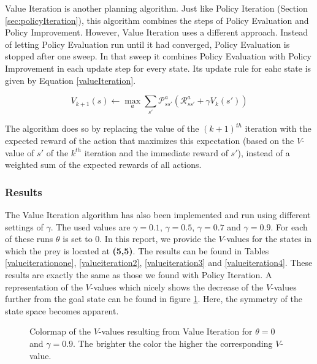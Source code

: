 \documentclass{article}
\begin{document}
Value Iteration is another planning algorithm. Just like Policy Iteration (Section \ref{sec:policyIteration}), this algorithm combines the steps of Policy Evaluation and Policy Improvement. However, Value Iteration uses a different approach. Instead of letting Policy Evaluation run until it had converged, Policy Evaluation is stopped after one sweep. In that sweep it combines Policy Evaluation with Policy Improvement in each update step for every state. Its update rule for eahc state is given by Equation \ref{valueIteration}.

\begin{equation}\label{valueIteration}
V_{k+1}(s) \leftarrow \max_a \sum_{s'} \mathcal P_{s s'}^{a} \left( \mathcal R_{s s'}^{a} + \gamma V_{k}(s') \right)
\end{equation}

The algorithm does so by replacing the value of the $(k+1)^{th}$ iteration with the expected reward of the action that maximizes this expectation (based on the $V$-value of $s' $ of the $k^{th}$ iteration and the immediate reward of $s' $), instead of a weighted sum of the expected rewards of all actions. 

\subsubsection{Results}
The Value Iteration algorithm has also been implemented and run using different settings of $\gamma$. The used values are $\gamma = 0.1$, $\gamma = 0.5$, $\gamma = 0.7$ and $\gamma = 0.9$. 
For each of these runs $\theta$ is set to 0. 
In this report, we provide the $V$-values for the states in which the prey is located at \textbf{(5,5)}. 
The results can be found in Tables \ref{valueiterationone}, \ref{valueiteration2}, \ref{valueiteration3} and \ref{valueiteration4}. These results are exactly the same as those we found with Policy Iteration. 
A representation of the $V$-values which nicely shows the decrease of the $V$-values further from the goal state can be found in figure \ref{colormapValueIteration}. Here, the symmetry of the state space becomes apparent.

\begin{figure}[htb]
        \caption{\label{colormapValueIteration} Colormap of the $V$-values  resulting from Value 
        		Iteration for $\theta=0$ and $\gamma = 0.9$. \newline
        		The brighter the color the higher the corresponding $V$-value.}
\end{figure}
\end{document}
